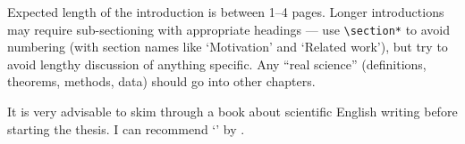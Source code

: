 Expected length of the introduction is between 1--4 pages. Longer introductions may require sub-sectioning with appropriate headings --- use \texttt{\textbackslash{}section*} to avoid numbering (with section names like `Motivation' and `Related work'), but try to avoid lengthy discussion of anything specific. Any ``real science'' (definitions, theorems, methods, data) should go into other chapters.

It is very advisable to skim through a book about scientific English writing before starting the thesis. I can recommend `' by \citet{glasman2010science}.
